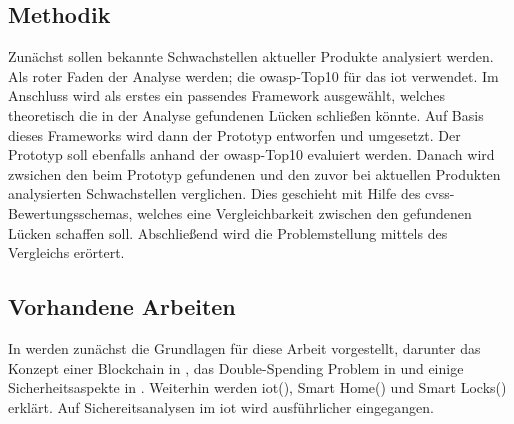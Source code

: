     \subsection{Methodik}
        Zunächst sollen bekannte Schwachstellen aktueller Produkte analysiert werden.
        Als roter Faden der Analyse werden; die \gls{owasp}-Top10 für das \gls{iot}\cite{Miessler2015a} verwendet.
        Im Anschluss wird als erstes ein passendes Framework ausgewählt, welches theoretisch die in der Analyse gefundenen Lücken schließen könnte.
        Auf Basis dieses Frameworks wird dann der Prototyp entworfen und umgesetzt.
        Der Prototyp soll ebenfalls anhand der \gls{owasp}-Top10 evaluiert werden.
        Danach wird zwsichen den beim Prototyp gefundenen und den zuvor bei aktuellen Produkten analysierten Schwachstellen verglichen.
        Dies geschieht mit Hilfe des \gls{cvss}-Bewertungsschemas, welches eine Vergleichbarkeit zwischen den gefundenen Lücken schaffen soll.
        Abschließend wird die Problemstellung mittels des Vergleichs erörtert.
    
    \subsection{Vorhandene Arbeiten}

	\vspace{3em}    
	\noindent In  werden zunächst die Grundlagen für diese Arbeit vorgestellt, darunter das Konzept einer Blockchain in , das Double-Spending Problem in  und einige Sicherheitsaspekte in .
	Weiterhin werden \gls{iot}(), Smart Home() und Smart Locks() erklärt.
	Auf Sichereitsanalysen im \gls{iot} wird ausführlicher eingegangen.

	
    